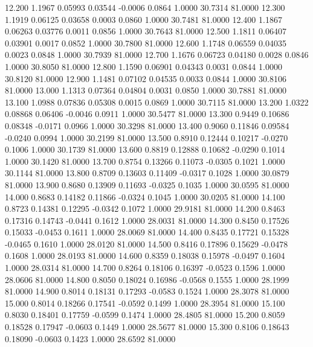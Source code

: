   12.200   1.1967   0.05993   0.03544  -0.0006   0.0864   1.0000  30.7314  81.0000
  12.300   1.1919   0.06125   0.03658   0.0003   0.0860   1.0000  30.7481  81.0000
  12.400   1.1867   0.06263   0.03776   0.0011   0.0856   1.0000  30.7643  81.0000
  12.500   1.1811   0.06407   0.03901   0.0017   0.0852   1.0000  30.7800  81.0000
  12.600   1.1748   0.06559   0.04035   0.0023   0.0848   1.0000  30.7939  81.0000
  12.700   1.1676   0.06723   0.04180   0.0028   0.0846   1.0000  30.8050  81.0000
  12.800   1.1590   0.06901   0.04343   0.0031   0.0844   1.0000  30.8120  81.0000
  12.900   1.1481   0.07102   0.04535   0.0033   0.0844   1.0000  30.8106  81.0000
  13.000   1.1313   0.07364   0.04804   0.0031   0.0850   1.0000  30.7881  81.0000
  13.100   1.0988   0.07836   0.05308   0.0015   0.0869   1.0000  30.7115  81.0000
  13.200   1.0322   0.08868   0.06406  -0.0046   0.0911   1.0000  30.5477  81.0000
  13.300   0.9449   0.10686   0.08348  -0.0171   0.0966   1.0000  30.3298  81.0000
  13.400   0.9060   0.11846   0.09584  -0.0240   0.0994   1.0000  30.2199  81.0000
  13.500   0.8910   0.12444   0.10217  -0.0270   0.1006   1.0000  30.1739  81.0000
  13.600   0.8819   0.12888   0.10682  -0.0290   0.1014   1.0000  30.1420  81.0000
  13.700   0.8754   0.13266   0.11073  -0.0305   0.1021   1.0000  30.1144  81.0000
  13.800   0.8709   0.13603   0.11409  -0.0317   0.1028   1.0000  30.0879  81.0000
  13.900   0.8680   0.13909   0.11693  -0.0325   0.1035   1.0000  30.0595  81.0000
  14.000   0.8683   0.14182   0.11866  -0.0324   0.1045   1.0000  30.0205  81.0000
  14.100   0.8723   0.14381   0.12295  -0.0342   0.1072   1.0000  29.9181  81.0000
  14.200   0.8463   0.17316   0.14743  -0.0441   0.1612   1.0000  28.0031  81.0000
  14.300   0.8450   0.17526   0.15033  -0.0453   0.1611   1.0000  28.0069  81.0000
  14.400   0.8435   0.17721   0.15328  -0.0465   0.1610   1.0000  28.0120  81.0000
  14.500   0.8416   0.17896   0.15629  -0.0478   0.1608   1.0000  28.0193  81.0000
  14.600   0.8359   0.18038   0.15978  -0.0497   0.1604   1.0000  28.0314  81.0000
  14.700   0.8264   0.18106   0.16397  -0.0523   0.1596   1.0000  28.0606  81.0000
  14.800   0.8050   0.18024   0.16986  -0.0568   0.1555   1.0000  28.1999  81.0000
  14.900   0.8014   0.18131   0.17293  -0.0583   0.1524   1.0000  28.3078  81.0000
  15.000   0.8014   0.18266   0.17541  -0.0592   0.1499   1.0000  28.3954  81.0000
  15.100   0.8030   0.18401   0.17759  -0.0599   0.1474   1.0000  28.4805  81.0000
  15.200   0.8059   0.18528   0.17947  -0.0603   0.1449   1.0000  28.5677  81.0000
  15.300   0.8106   0.18643   0.18090  -0.0603   0.1423   1.0000  28.6592  81.0000
